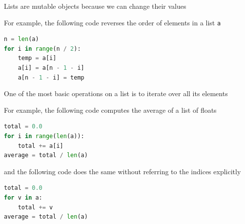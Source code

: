 \documentclass[8pt,a4paper,compress]{beamer}
\begin{document}
\begin{frame}[fragile]
\pause

Lists are mutable objects because we can change their values

\pause
\bigskip

For example, the following code reverses the order of elements in a list \lstinline{a}

\begin{lstlisting}[language=Python]
n = len(a)
for i in range(n / 2):
    temp = a[i]
    a[i] = a[n - 1 - i]
    a[n - 1 - i] = temp
\end{lstlisting}

\pause
\bigskip

One of the most basic operations on a list is to iterate over all its elements

\pause
\bigskip

For example, the following code computes the average of a list of floats

\begin{lstlisting}[language=Python]
total = 0.0
for i in range(len(a)):
    total += a[i]
average = total / len(a)
\end{lstlisting}

\pause

and the following code does the same without referring to the indices explicitly

\begin{lstlisting}[language=Python]
total = 0.0
for v in a:
    total += v
average = total / len(a)
\end{lstlisting}
\end{frame}
\end{document}
